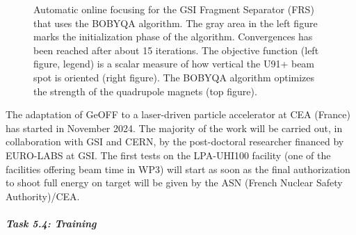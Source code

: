 \begin{figure}
    \caption{Automatic online focusing for the GSI Fragment Separator (FRS) that uses the BOBYQA algorithm. The gray area in the left figure marks the initialization phase of the algorithm. Convergences has been reached after about 15 iterations. The objective function (left figure, legend) is a scalar measure of how vertical the U91+ beam spot is oriented (right figure). The BOBYQA algorithm optimizes the strength of the quadrupole magnets (top figure).}
    \label{fig:wp5_frs}
\end{figure}

The adaptation of GeOFF to a laser-driven particle accelerator
at CEA (France) has started in  November 2024. The majority of the work will be carried out, in collaboration with GSI and CERN, by the post-doctoral researcher financed by EURO-LABS at GSI. The first tests on the LPA-UHI100 facility (one of the facilities offering beam time in WP3) will start as soon as the final authorization to shoot full energy on target will be given by the ASN (French Nuclear Safety Authority)/CEA. 

\subparagraph{Task 5.4: Training} \mbox{}

